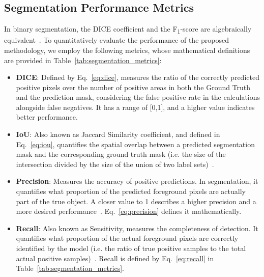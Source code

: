 \documentclass[runningheads]{llncs}
\begin{document}
\subsection{Segmentation Performance Metrics}
\label{sec:segm-perf-metrics}
In binary segmentation, the \ac{DICE} coefficient and the
F\textsubscript{1}-score are algebraically
equivalent~\cite{Shen2018}. To quantitatively evaluate the performance
of the proposed methodology, we employ the following metrics, whose
mathematical definitions are provided in
Table~\ref{tab:segmentation_metrics}:
\begin{itemize}
\item \textbf{\ac{DICE}}: Defined by Eq.~\eqref{eq:dice}, measures the ratio of
  the correctly predicted positive pixels over the number of positive
  areas in both the Ground Truth and the prediction mask, considering
  the false positive rate in the calculations alongside false
  negatives. It has a range of [0,1], and a higher value indicates
  better performance\cite{Yao2023}.
\item \textbf{\ac{IoU}}: Also known as Jaccard Similarity coefficient, and
  defined in Eq.~\eqref{eq:iou}, quantifies the spatial overlap
  between a predicted segmentation mask and the corresponding ground
  truth mask (i.e. the size of the intersection divided by the size of
  the union of two label sets)~\cite{4781564,Yao2023}.
\item \textbf{Precision}: Measures the accuracy of positive predictions. In
  segmentation, it quantifies what proportion of the predicted
  foreground pixels are actually part of the true
  object. A closer value to 1 describes a higher precision and a more
  desired performance~\cite{Yao2023}. Eq.~\eqref{eq:precision} defines
  it mathematically.
\item \textbf{Recall}: Also known as Sensitivity, measures the completeness of
  detection. It quantifies what proportion of the actual foreground
  pixels are correctly identified by the model (i.e. the ratio of true
  positive samples to the total actual positive
  samples)~\cite{Yao2023}. Recall is defined by Eq.~\eqref{eq:recall}
  in Table~\ref{tab:segmentation_metrics}.
\end{itemize}
\end{document}
